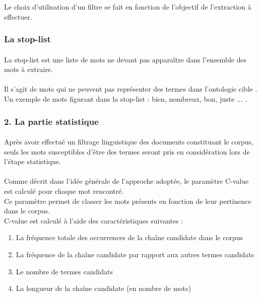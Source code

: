 \documentclass[12pt, a4paper, oneside]{book}
\begin{document}
Le choix d'utilisation d'un filtre se fait en fonction de l'objectif de l'extraction à effectuer.

\subsubsection{La stop-list}

\paragraph{}
La stop-list est une liste de mots ne devant pas apparaître dans l'ensemble des mots à extraire.
\paragraph{}
Il s'agit de mots qui ne peuvent pas représenter des termes dans l'ontologie cible \citep{stop}. \\
Un exemple de mots figurant dans la stop-list : bien, nombreux, bon, juste ... . 


\subsubsection{2. La partie statistique}
\paragraph{}
Après avoir effectué un filtrage linguistique des documents constituant le corpus,
seuls les mots susceptibles d'être des termes seront pris en considération lors de l'étape statistique\cite{cvalue}.
\paragraph{}
Comme décrit dans l'idée générale de l'approche adoptée, le paramètre C-value est calculé pour chaque mot rencontré.\\
Ce paramètre permet de classer les mots présents en fonction de leur pertinence dans le corpus.\\
C-value est calculé à l'aide des caractéristiques suivantes : \\
\begin{enumerate}
\item La fréquence totale des occurrences de la chaîne candidate dans le corpus\\
\item La fréquence de la chaîne candidate par rapport aux autres termes candidats\\
\item Le nombre de termes candidats\\
\item La longueur de la chaîne candidate (en nombre de mots)\\


\end{enumerate}
\end{document}
